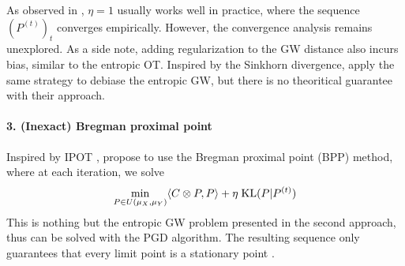 As observed in \citep{Peyre19}, $\eta = 1$ usually works well in practice,
where the sequence $(P^{(t)})_t$ converges empirically. However, the convergence analysis remains
unexplored. As a side note, adding regularization to the GW distance also incurs bias,
similar to the entropic OT. Inspired by the Sinkhorn divergence,
\citep{Bunne19} apply the same strategy to debiase the entropic GW,
but there is no theoritical guarantee with their approach.

\paragraph{3. (Inexact) Bregman proximal point} Inspired by IPOT \citep{Xie20}, \citep{Xu19, Xu19b}
propose to use the Bregman proximal point (BPP) method, where at each iteration, we solve
\begin{align}
  \min_{P \in U(\mu_X, \mu_Y)} \langle C \otimes P, P \rangle + \eta \; \text{KL}(P | P^{(t)})
\end{align}
This is nothing but the entropic GW problem presented in the second approach, thus can be solved
with the PGD algorithm. The resulting sequence only guarantees that
every limit point is a stationary point \citep{Xu19}.

